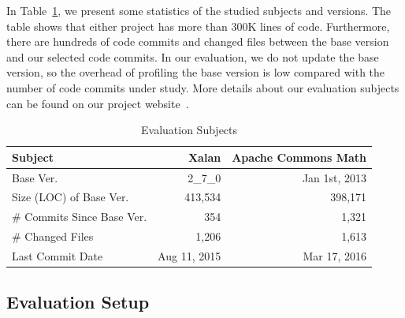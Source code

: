 
In Table~\ref{tab:subjects}, we present some statistics of the studied subjects and versions. The table shows that either project has more than 300K lines of code. Furthermore, there are hundreds of code commits and changed files between the base version and our selected code commits. In our evaluation, we do not update the base version, so the overhead of profiling the base version is low compared with the number of code commits under study.  More details about our evaluation subjects can be found on our project website~\cite{perfranker}.

\begin{table}
	\centering
	\caption{Evaluation Subjects}	
	
	
	\label{tab:subjects}
	\begin{tabular}{|l|r|r|} 
		\hline
		Subject  & Xalan  & Apache Commons Math  \\ 
		\hline
		Base Ver. & 2\_7\_0 & Jan 1st, 2013 \\ 
		\hline
		Size (LOC) of Base Ver. & 413,534   & 398,171  \\ 
		\hline		
		\# Commits Since Base Ver. & 354   & 1,321 \\ 
		\hline
		\# Changed Files  & 1,206  & 1,613 \\ 
		\hline
		Last Commit Date &Aug 11, 2015&Mar 17, 2016     \\ 
		\hline
	\end{tabular}
	\vspace{+1cm}
\end{table}






\subsection{Evaluation Setup}
\label{subsec:setup}


